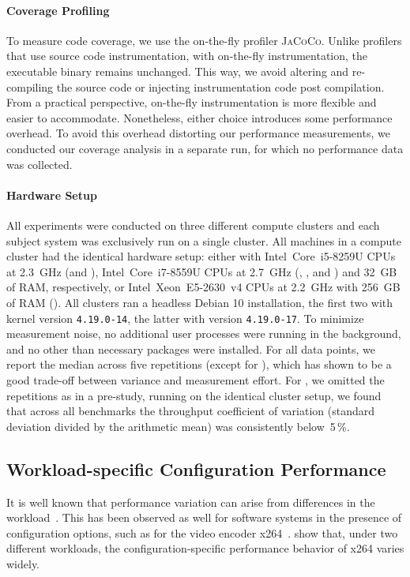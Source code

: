 \paragraph*{Coverage Profiling}\label{sec:profiling}
To measure code coverage, we use the on-the-fly profiler \textsc{JaCoCo}. Unlike profilers that use source code instrumentation, with on-the-fly instrumentation, the executable binary remains unchanged. This way, we avoid altering and re-compiling the source code or injecting instrumentation code post compilation. From a practical perspective, on-the-fly instrumentation is more flexible and easier to accommodate. Nonetheless, either choice introduces some performance overhead. To avoid this overhead distorting our performance measurements, we conducted our coverage analysis in a separate run, for which no performance data was collected. 	
	
\paragraph*{Hardware Setup}
All experiments were conducted on three different compute clusters and each subject system was exclusively run on a single cluster. All machines in a compute cluster had the identical hardware setup: either with Intel~Core~i5-8259U CPUs at 2.3~GHz (\jumper and \kanzi),  Intel~Core~i7-8559U CPUs at 2.7~GHz (\dconvert, \batik, and \jadx) and 32~GB of RAM, respectively, or Intel~Xeon~E5-2630~v4 CPUs at 2.2~GHz with 256~GB of RAM (\htwo). All clusters ran a headless Debian 10 installation, the first two with kernel version \mbox{\texttt{4.19.0-14}}, the latter with version \mbox{\texttt{4.19.0-17}}. 
To minimize measurement noise, no additional user processes were running in the background, and no other than necessary packages were installed.	For all data points, we report the median across five repetitions (except for \htwo), which has shown to be a good trade-off between variance and measurement effort. For \htwo, we omitted the repetitions as in a pre-study, running on the identical cluster setup, we found that across all benchmarks the throughput coefficient of variation (standard deviation divided by the arithmetic mean) was consistently below~5\,\%.

\subsection{Workload-specific Configuration Performance}\label{sec:rq1}
It is well known that performance variation can arise from differences in the workload~\cite{benchmarking_book}. 
This has been observed as well for software systems in the presence of configuration options, such as for the video encoder x264~\cite{alves_sampling_2020}. \citeauthor{alves_sampling_2020} show that, under two different workloads, the configuration-specific performance behavior of x264 varies widely. 

